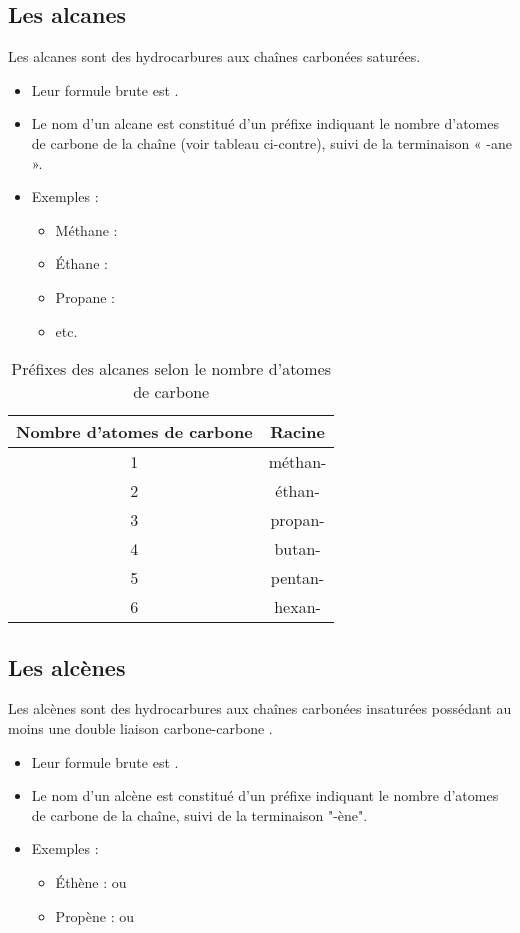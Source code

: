 \documentclass{article}
\begin{document}
\subsection{Les alcanes}

Les alcanes sont des hydrocarbures aux chaînes carbonées saturées.
\begin{itemize}[noitemsep]
    \item Leur formule brute est .
    \item Le nom d'un alcane est constitué d'un préfixe indiquant le nombre d'atomes de carbone de la chaîne (voir tableau ci-contre), suivi de la terminaison « -ane ».
    \item Exemples :
    \begin{itemize}
        \item Méthane : 
        \item Éthane : 
        \item Propane : 
        \item etc.
    \end{itemize}
\end{itemize}

\begin{table}[h]
    \centering
    \begin{tabular}{|c|c|}
    \hline
    Nombre d'atomes de carbone & Racine \\
    \hline
    1 & méthan- \\
    2 & éthan- \\
    3 & propan- \\
    4 & butan- \\
    5 & pentan- \\
    6 & hexan- \\
    \hline
    \end{tabular}
    \caption{Préfixes des alcanes selon le nombre d'atomes de carbone}
\end{table}

\subsection{Les alcènes}

Les alcènes sont des hydrocarbures aux chaînes carbonées insaturées possédant au moins une double liaison carbone-carbone .
\begin{itemize}[noitemsep]
    \item Leur formule brute est .
    \item Le nom d'un alcène est constitué d'un préfixe indiquant le nombre d'atomes de carbone de la chaîne, suivi de la terminaison  "-ène".
    \item Exemples :
    \begin{itemize}
        \item Éthène :  ou 
        \item Propène :  ou 
    \end{itemize}
\end{itemize}
\end{document}
